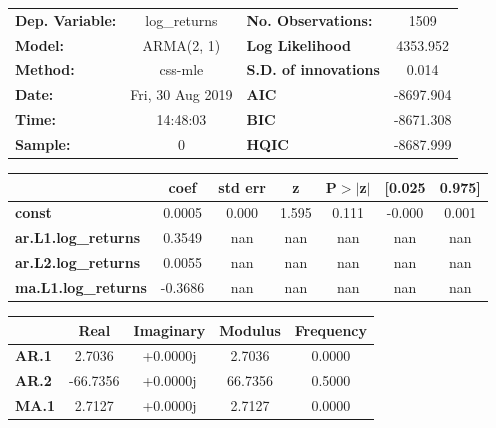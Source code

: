 \begin{center}
\begin{tabular}{lclc}
\toprule
\textbf{Dep. Variable:}     &        log\_returns       & \textbf{  No. Observations:  } &            1509            \\
\textbf{Model:}             &         ARMA(2, 1)        & \textbf{  Log Likelihood     } &          4353.952          \\
\textbf{Method:}            &          css-mle          & \textbf{  S.D. of innovations} &           0.014            \\
\textbf{Date:}              &      Fri, 30 Aug 2019     & \textbf{  AIC                } &         -8697.904          \\
\textbf{Time:}              &          14:48:03         & \textbf{  BIC                } &         -8671.308          \\
\textbf{Sample:}            &             0             & \textbf{  HQIC               } &         -8687.999          \\
\bottomrule
\end{tabular}
\begin{tabular}{lcccccc}
                            & \textbf{coef} & \textbf{std err} & \textbf{z} & \textbf{P$> |$z$|$} & \textbf{[0.025} & \textbf{0.975]}  \\
\midrule
\textbf{const}              &       0.0005  &        0.000     &     1.595  &         0.111        &       -0.000    &        0.001     \\
\textbf{ar.L1.log\_returns} &       0.3549  &          nan     &       nan  &           nan        &          nan    &          nan     \\
\textbf{ar.L2.log\_returns} &       0.0055  &          nan     &       nan  &           nan        &          nan    &          nan     \\
\textbf{ma.L1.log\_returns} &      -0.3686  &          nan     &       nan  &           nan        &          nan    &          nan     \\
\bottomrule
\end{tabular}
\begin{tabular}{lcccc}
              & \textbf{            Real} & \textbf{         Imaginary} & \textbf{         Modulus} & \textbf{        Frequency}  \\
\midrule
\textbf{AR.1} &                2.7036     &                +0.0000j     &                2.7036     &                0.0000       \\
\textbf{AR.2} &              -66.7356     &                +0.0000j     &               66.7356     &                0.5000       \\
\textbf{MA.1} &                2.7127     &                +0.0000j     &                2.7127     &                0.0000       \\
\bottomrule
\end{tabular}
\end{center}
